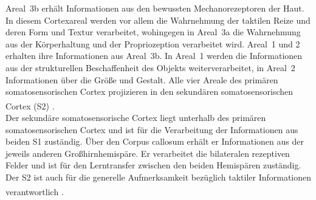 \documentclass[12pt,a4paper,pdftex]{article}
\begin{document}
\newpage
Areal~3b erhält Informationen aus den bewussten Mechanorezeptoren der Haut. In diesem Cortexareal werden vor allem die Wahrnehmung der taktilen Reize und deren Form und Textur verarbeitet, wohingegen in Areal~3a die Wahrnehmung aus der Körperhaltung und der Propriozeption verarbeitet wird. Areal~1 und 2 erhalten ihre Informationen aus Areal~3b. In Areal~1 werden die Informationen aus der strukturellen Beschaffenheit des Objekts weiterverarbeitet, in Areal~2 Informationen über die Größe und Gestalt. Alle vier Areale des primären somatosensorischen Cortex projizieren in den sekundären somatosensorischen Cortex (S2) \textsuperscript{\cite[12]{neurowissenschaften_baer}}.
\\
\noindent Der sekundäre somatosensorische Cortex  liegt unterhalb des primären somatosensorischen Cortex und ist für die Verarbeitung der Informationen aus beiden S1 zuständig. Über den Corpus callosum erhält er Informationen aus der jeweils anderen Großhirnhemispäre. Er verarbeitet die bilateralen rezeptiven Felder und ist für den Lerntransfer zwischen den beiden Hemispären zuständig. Der S2 ist auch für die generelle Aufmerksamkeit bezüglich taktiler Informationen verantwortlich \textsuperscript{\cite[12]{neurowissenschaften_baer}}.
\end{document}
